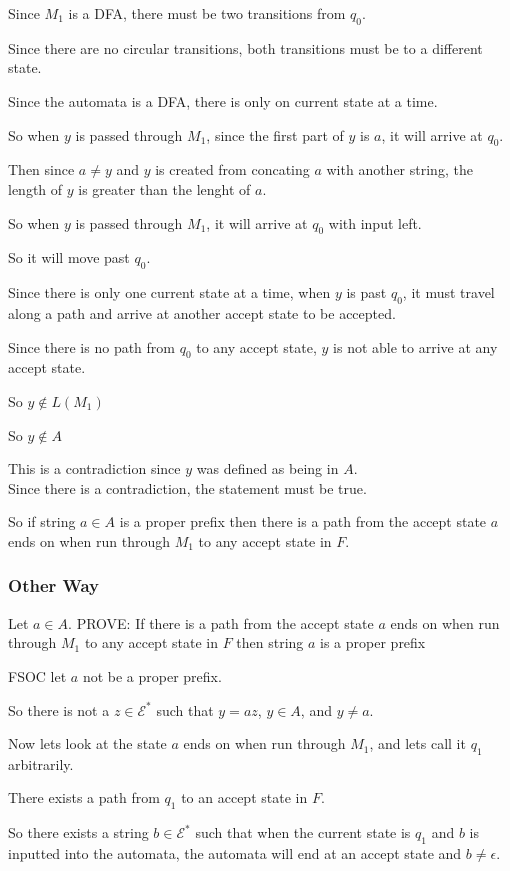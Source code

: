 \documentclass[letterpaper, 11pt]{article}
\begin{document}
Since $M_1$ is a DFA, there must be two transitions from $q_0$.

Since there are no circular transitions, both transitions must be to a different state.

Since the automata is a DFA, there is only on current state at a time.

So when $y$ is passed through $M_1$, since the first part of $y$ is $a$, it will arrive at $q_0$.

Then since $a \neq y$ and $y$ is created from concating $a$ with another string, the length of $y$ is greater than the lenght of $a$.

So when $y$ is passed through $M_1$, it will arrive at $q_0$ with input left.

So it will move past $q_0$.

Since there is only one current state at a time, when $y$ is past $q_0$, it must travel along a path and arrive at another accept state to be accepted.

Since there is no path from $q_0$ to any accept state, $y$ is not able to arrive at any accept state.

So $y \notin L(M_1)$

So $y \notin A$

This is a contradiction since $y$ was defined as being in $A$.\\

Since there is a contradiction, the statement must be true.

So if string $a \in A$ is a proper prefix then there is a path from the accept state $a$ ends on when run through $M_1$ to any accept state in $F$.
\subsubsection*{Other Way}
Let $a \in A$.
PROVE: If there is a path from the accept state $a$ ends on when run through $M_1$ to any accept state in $F$ then string $a$ is a proper prefix

FSOC let $a$ not be a proper prefix.

So there is not a $z \in \mathcal{E}^*$ such that $y = az$, $y \in A$, and $y \neq a$.

Now lets look at the state $a$ ends on when run through $M_1$, and lets call it $q_1$ arbitrarily.

There exists a path from $q_1$ to an accept state in $F$.

So there exists a string $b \in \mathcal{E}^*$ such that when the current state is $q_1$ and $b$ is inputted into the automata, the automata will end at an accept state and $b \neq \epsilon$.
\end{document}
